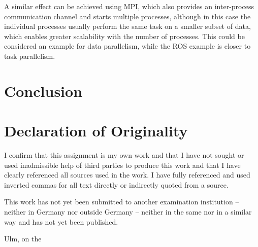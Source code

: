 \documentclass[BCOR20mm,DIV14,10pt,headinclude,footexclude,bibtotoc,liststotoc]{article}
\begin{document}
A similar effect can be achieved using MPI, which also provides an inter-process
communication channel and starts multiple processes, although in this case the
individual processes usually perform the same task on a smaller subset of data,
which enables greater scalability with the number of processes. This could be
considered an example for data parallelism, while the ROS example is closer to
task parallelism.

\section{Conclusion}

\cleardoublepage
\section*{Declaration of Originality}

I confirm that this assignment is my own work and that I have not sought or used
inadmissible help of third parties to produce this work and that I have clearly
referenced all sources used in the work. I have fully referenced and used
inverted commas for all text directly or indirectly quoted from a source.

This work has not yet been submitted to another examination institution –
neither in Germany nor outside Germany – neither in the same nor in a similar
way and has not yet been published.

\vspace{2cm}

Ulm, on the \dotfill

\hspace{10cm} {\footnotesize \theauthor}
\end{document}
